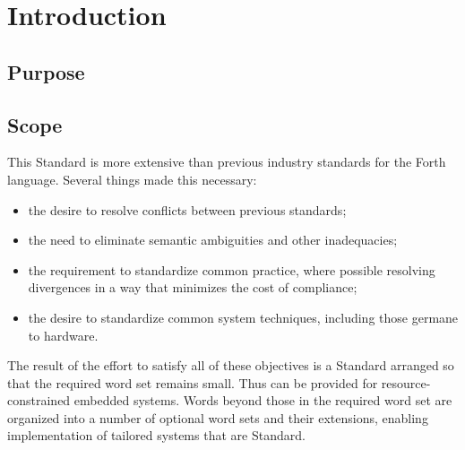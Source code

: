 \label{annex:rationale}

\ifanswerfiles
\fi

\newcommand{\readrationale}[1]{%
	\ifinline
		\fbox{\parbox{\linewidth}{\slshape
		In the \emph{review} (r) version of the document the
		rationale text for each of the words is given in with
		the main definition of the word.  The rationale for
		words in the \textbf{#1} wordset will appear here in
		the final document.
		}}
	\else
		\defersection{}
		
		\stepsection
	\fi
}

\section{Introduction} %

\subsection{Purpose} %

\subsection{Scope} %

This Standard is more extensive than previous industry standards
for the Forth language. Several things made this necessary:

\begin{itemize}
\item the desire to resolve conflicts between previous standards;
\item the need to eliminate semantic ambiguities and other
	inadequacies;
\item the requirement to standardize common practice, where possible
	resolving divergences in a way that minimizes the cost of
	compliance;
\item the desire to standardize common system techniques, including
	those germane to hardware.
\end{itemize}

The result of the effort to satisfy all of these objectives is a
Standard arranged so that the required word set remains small. Thus
 can be provided for resource-constrained embedded systems.
Words beyond those in the required word set are organized into a
number of optional word sets and their extensions, enabling
implementation of tailored systems that are Standard.

